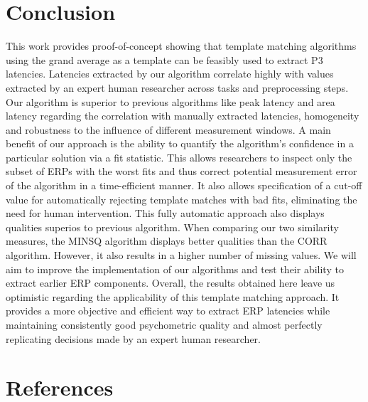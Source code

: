 \documentclass[
  man,floatsintext]{apa7}
\begin{document}
\hypertarget{conclusion}{%
\section{Conclusion}\label{conclusion}}

This work provides proof-of-concept showing that template matching algorithms using the grand average as a template can be feasibly used to extract P3 latencies. Latencies extracted by our algorithm correlate highly with values extracted by an expert human researcher across tasks and preprocessing steps. Our algorithm is superior to previous algorithms like peak latency and area latency regarding the correlation with manually extracted latencies, homogeneity and robustness to the influence of different measurement windows. A main benefit of our approach is the ability to quantify the algorithm's confidence in a particular solution via a fit statistic. This allows researchers to inspect only the subset of ERPs with the worst fits and thus correct potential measurement error of the algorithm in a time-efficient manner. It also allows specification of a cut-off value for automatically rejecting template matches with bad fits, eliminating the need for human intervention. This fully automatic approach also displays qualities superios to previous algorithm. When comparing our two similarity measures, the MINSQ algorithm displays better qualities than the CORR algorithm. However, it also results in a higher number of missing values. We will aim to improve the implementation of our algorithms and test their ability to extract earlier ERP components. Overall, the results obtained here leave us optimistic regarding the applicability of this template matching approach. It provides a more objective and efficient way to extract ERP latencies while maintaining consistently good psychometric quality and almost perfectly replicating decisions made by an expert human researcher.

\newpage

\hypertarget{references}{%
\section{References}\label{references}}
\end{document}
